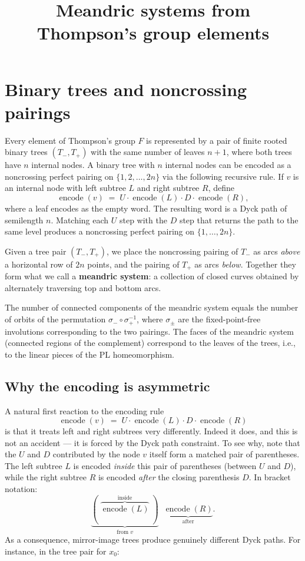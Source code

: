 \documentclass[11pt]{article}
\title{Meandric systems from Thompson's group elements}
\author{}
\date{}
\newcommand{\encode}{\operatorname{encode}}
\begin{document}
\maketitle

\section{Binary trees and noncrossing pairings}

Every element of Thompson's group $F$ is represented by a pair of finite rooted binary trees $(T_-, T_+)$ with the same number of leaves $n+1$, where both trees have $n$ internal nodes.  A binary tree with $n$ internal nodes can be encoded as a noncrossing perfect pairing on $\{1, 2, \ldots, 2n\}$ via the following recursive rule.  If $v$ is an internal node with left subtree $L$ and right subtree $R$, define
\[
  \encode(v) \;=\; U \cdot \encode(L) \cdot D \cdot \encode(R),
\]
where a leaf encodes as the empty word.  The resulting word is a Dyck path of semilength $n$.  Matching each $U$ step with the $D$ step that returns the path to the same level produces a noncrossing perfect pairing on $\{1, \ldots, 2n\}$.

Given a tree pair $(T_-, T_+)$, we place the noncrossing pairing of $T_-$ as arcs \emph{above} a horizontal row of $2n$ points, and the pairing of $T_+$ as arcs \emph{below}.  Together they form what we call a \textbf{meandric system}: a collection of closed curves obtained by alternately traversing top and bottom arcs.

The number of connected components of the meandric system equals the number of orbits of the permutation $\sigma_- \circ \sigma_+^{-1}$, where $\sigma_\pm$ are the fixed-point-free involutions corresponding to the two pairings.  The faces of the meandric system (connected regions of the complement) correspond to the leaves of the trees, i.e., to the linear pieces of the PL homeomorphism.

\subsection*{Why the encoding is asymmetric}

A natural first reaction to the encoding rule
\[
  \encode(v) \;=\; U \cdot \encode(L) \cdot D \cdot \encode(R)
\]
is that it treats left and right subtrees very differently.  Indeed it does, and this is not an accident --- it is forced by the Dyck path constraint.  To see why, note that the $U$ and $D$ contributed by the node $v$ itself form a matched pair of parentheses.  The left subtree $L$ is encoded \emph{inside} this pair of parentheses (between $U$ and $D$), while the right subtree $R$ is encoded \emph{after} the closing parenthesis $D$.  In bracket notation:
\[
  \underbrace{(\;\overbrace{\encode(L)}^{\text{inside}}\;)}_{\text{from } v}\;\;\underbrace{\encode(R)}_{\text{after}}.
\]
As a consequence, mirror-image trees produce genuinely different Dyck paths.  For instance, in the tree pair for $x_0$:
\end{document}
